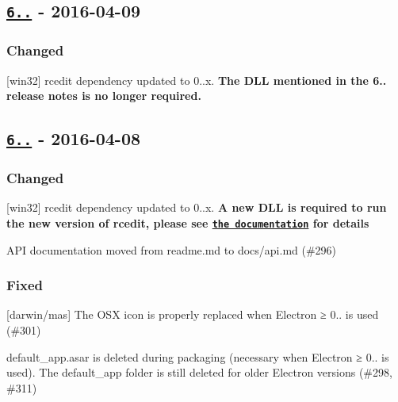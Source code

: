 \subsection*{\href{https://github.com/electron-userland/electron-packager/compare/v6.0.1...v6.0.2}{\tt 6..} -\/ 2016-\/04-\/09}

\subsubsection*{Changed}


\begin{DoxyItemize}
\item \mbox{[}win32\mbox{]} {\ttfamily rcedit} dependency updated to 0..\+x. {\bfseries The D\+LL mentioned in the 6.. release notes is no longer required.}
\end{DoxyItemize}

\subsection*{\href{https://github.com/electron-userland/electron-packager/compare/v6.0.0...v6.0.1}{\tt 6..} -\/ 2016-\/04-\/08}

\subsubsection*{Changed}


\begin{DoxyItemize}
\item \mbox{[}win32\mbox{]} {\ttfamily rcedit} dependency updated to 0..\+x. {\bfseries A new D\+LL is required to run the new version of rcedit, please see \href{https://github.com/electron-userland/electron-packager/blob/master/readme.md#building-windows-apps-from-non-windows-platforms}{\tt the documentation} for details}
\item A\+PI documentation moved from readme.\+md to docs/api.\+md (\#296)
\end{DoxyItemize}

\subsubsection*{Fixed}


\begin{DoxyItemize}
\item \mbox{[}darwin/mas\mbox{]} The O\+SX icon is properly replaced when Electron ≥ 0.. is used (\#301)
\item {\ttfamily default\+\_\+app.\+asar} is deleted during packaging (necessary when Electron ≥ 0.. is used). The {\ttfamily default\+\_\+app} folder is still deleted for older Electron versions (\#298, \#311)
\end{DoxyItemize}

